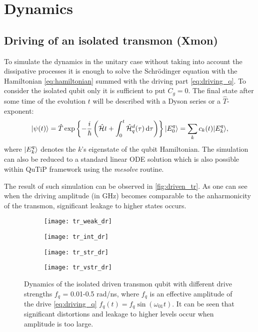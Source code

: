 \documentclass[12pt, twoside]{report}
\newcommand{\diff}{\,\mathrm{d}}
\DeclarePairedDelimiter\ket{\lvert}{\rangle}
\newcommand{\rbrkt}[1]{\left( #1 \right)}
\numberwithin{equation}{section}
\begin{document}
\section{Dynamics}\label{sec:dynamics}

\subsection{Driving of an isolated transmon (Xmon)}

To simulate the dynamics in the unitary case without taking into account the dissipative processes it is enough to solve the Schrödinger equation with the Hamiltonian \eqref{eq:hamiltonian} summed with the driving part \eqref{eq:driving_q}. To consider the isolated qubit only it is sufficient to put $C_g = 0$. The final state after some time of the evolution $t$ will be described with a Dyson series or a $\hat T$-exponent:
\begin{equation}
\ket{\psi (t)} = \hat T \exp\left\{-\frac{i}{\hbar} \rbrkt{\mathcal{\hat H}t + \int_0^t \mathcal{\hat H}_q^d(\tau) \diff\tau}\right\} \ket{E_0^q}= \sum_k c_k(t) \ket{E^q_k},
\end{equation} 
where $\ket{E_k^q}$ denotes the $k$'s eigenstate of the qubit Hamiltonian. The simulation can also be reduced to a standard linear ODE solution which is also possible within QuTiP framework using the \textit{mesolve} routine.

The result of such simulation can be observed in \autoref{fig:driven_tr}. As one can see when the driving amplitude (in GHz) becomes comparable to the anharmonicity of the transmon, significant leakage to higher states occurs.

\begin{figure}[h!]
\centering
\begin{subfigure}[t]{0.45\textwidth}
\texttt{[image: tr\_weak\_dr]}
\end{subfigure}
\begin{subfigure}[t]{0.45\textwidth}
\texttt{[image: tr\_int\_dr]}
\end{subfigure}

\begin{subfigure}[t]{0.45\textwidth}
\texttt{[image: tr\_str\_dr]}
\end{subfigure}
\begin{subfigure}[t]{0.45\textwidth}
\texttt{[image: tr\_vstr\_dr]}
\end{subfigure}
\caption{Dynamics of the isolated driven transmon qubit with different drive strengths $f_q$ = 0.01-0.5 rad/ns, where $f_q$ is an effective amplitude of the drive \eqref{eq:driving_q} $f_q (t) = f_q \sin(\omega_{01} t)$. It can be seen that significant distortions and leakage to higher levels occur when amplitude is too large.}
\label{fig:driven_tr}
\end{figure}
\end{document}
